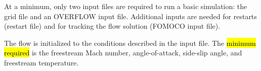 

At a minimum, only two input files are required to run a basic simulation: the grid file and an OVERFLOW input file. Additional inputs are needed for restarts (restart file) and for tracking the flow solution (FOMOCO input file). 

The flow is initialized to the conditions described in the input file. The \hl{minimum required} is the freestream Mach number, angle-of-attack, side-slip angle, and freestream temperature.



% 

